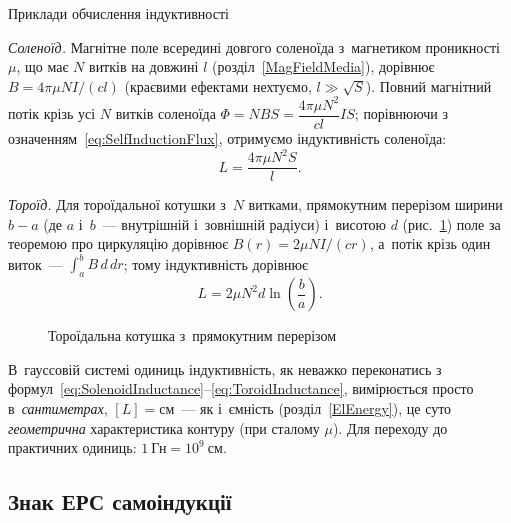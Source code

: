 \begin{Example}{Приклади обчислення індуктивності}

	\emph{Соленоїд.} Магнітне поле всередині довгого соленоїда з~магнетиком проникності
	$\mu$, що має $N$ витків на довжині $l$ (розділ~\ref{MagFieldMedia}),
	дорівнює $B = 4\pi\mu NI/(cl)$ (краєвими ефектами нехтуємо, $l\gg\sqrt S$). Повний магнітний потік крізь усі $N$ витків соленоїда
	$\Phi = NBS = \dfrac{4\pi\mu N^2}{cl}IS$; порівнюючи з
	означенням~\eqref{eq:SelfInductionFlux}, отримуємо індуктивність соленоїда:
	\begin{equation}\label{eq:SolenoidInductance}
		L = \frac{4\pi\mu N^2 S}{l}.
	\end{equation}

	\emph{Тороїд.} Для тороїдальної котушки з~$N$ витками, прямокутним перерізом
	ширини $b-a$ (де $a$ і~$b$~--- внутрішній і~зовнішній радіуси) і~висотою $d$ (рис.~\ref{pic:Toroid})
	поле за теоремою про циркуляцію дорівнює $B(r)=2\mu NI/(cr)$, а~потік крізь
	один виток~--- $\int_a^b B\,d\,dr$; тому індуктивність дорівнює
	\begin{equation}\label{eq:ToroidInductance}
		L = 2\mu N^2 d\ln\left(\frac{b}{a}\right).
	\end{equation}
\end{Example}

\begin{figure}[h!]\centering
	\caption{Тороїдальна котушка з~прямокутним перерізом\label{pic:Toroid}}
\end{figure}

В~гауссовій системі одиниць індуктивність, як неважко переконатись з
формул~\eqref{eq:SolenoidInductance}--\eqref{eq:ToroidInductance}, вимірюється просто
в~\emph{сантиметрах}, $[L]=\text{см}$~--- як і~ємність (розділ~\ref{ElEnergy}), це суто \emph{геометрична}
характеристика контуру (при сталому $\mu$). Для переходу до практичних одиниць: $1\
	\text{Гн}=10^{9}\ \text{см}$.

\subsection*{Знак ЕРС самоіндукції}

